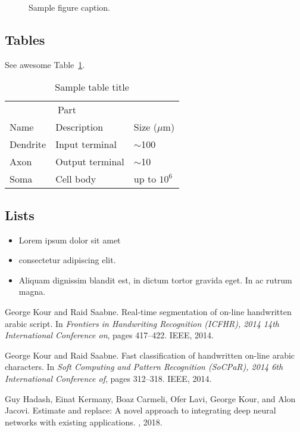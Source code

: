 \documentclass{article}
\begin{document}
\begin{figure}
  \centering
  \fbox{\rule[-.5cm]{4cm}{4cm} \rule[-.5cm]{4cm}{0cm}}
  \caption{Sample figure caption.}
  \label{fig:fig1}
\end{figure}

\subsection{Tables}
\lipsum[12]
See awesome Table~\ref{tab:table}.

\begin{table}
 \caption{Sample table title}
  \centering
  \begin{tabular}{lll}
    \toprule
    \multicolumn{2}{c}{Part}                   \\
    \cmidrule(r){1-2}
    Name     & Description     & Size ($\mu$m) \\
    \midrule
    Dendrite & Input terminal  & $\sim$100     \\
    Axon     & Output terminal & $\sim$10      \\
    Soma     & Cell body       & up to $10^6$  \\
    \bottomrule
  \end{tabular}
  \label{tab:table}
\end{table}

\subsection{Lists}
\begin{itemize}
\item Lorem ipsum dolor sit amet
\item consectetur adipiscing elit.
\item Aliquam dignissim blandit est, in dictum tortor gravida eget. In ac rutrum magna.
\end{itemize}





\begin{thebibliography}{1}

George Kour and Raid Saabne.
\newblock Real-time segmentation of on-line handwritten arabic script.
\newblock In {\em Frontiers in Handwriting Recognition (ICFHR), 2014 14th
  International Conference on}, pages 417--422. IEEE, 2014.

George Kour and Raid Saabne.
\newblock Fast classification of handwritten on-line arabic characters.
\newblock In {\em Soft Computing and Pattern Recognition (SoCPaR), 2014 6th
  International Conference of}, pages 312--318. IEEE, 2014.

Guy Hadash, Einat Kermany, Boaz Carmeli, Ofer Lavi, George Kour, and Alon
  Jacovi.
\newblock Estimate and replace: A novel approach to integrating deep neural
  networks with existing applications.
, 2018.

\end{thebibliography}
\end{document}
